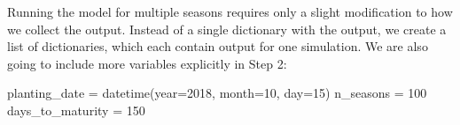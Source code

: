 \documentclass[11pt]{article}
\newenvironment{Shaded}{}{}
\newcommand{\DecValTok}[1]{\textcolor[rgb]{0.25,0.63,0.44}{{#1}}}
\newcommand{\NormalTok}[1]{{#1}}
\newcommand{\OperatorTok}[1]{\textcolor[rgb]{0.40,0.40,0.40}{{#1}}}
\begin{document}
Running the model for multiple seasons requires only a slight
modification to how we collect the output. Instead of a single
dictionary with the output, we create a list of dictionaries, which each
contain output for one simulation. We are also going to include more
variables explicitly in Step 2:

\begin{Shaded}
\begin{Highlighting}[]
\NormalTok{planting_date }\OperatorTok{=}\NormalTok{ datetime(year}\OperatorTok{=}\DecValTok{2018}\NormalTok{, month}\OperatorTok{=}\DecValTok{10}\NormalTok{, day}\OperatorTok{=}\DecValTok{15}\NormalTok{)}
\NormalTok{n_seasons }\OperatorTok{=} \DecValTok{100}
\NormalTok{days_to_maturity }\OperatorTok{=} \DecValTok{150}
\end{Highlighting}
\end{Shaded}
\end{document}
